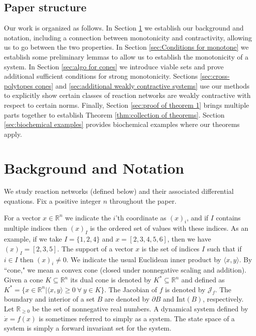 \documentclass{article}
\begin{document}
\subsection{Paper structure}
Our work is organized as follows. In Section \ref{sec:background} we establish our background and notation, including a connection between monotonicity and contractivity, allowing us to go between the two properties. In Section \ref{sec:Conditions for monotone} we establish some preliminary lemmas to allow us to establish the monotonicity of a system. In Section \ref{sec:algo for cones} we introduce viable sets and prove additional sufficient conditions for strong monotonicity. Sections \ref{sec:cross-polytopes cones} and \ref{sec:additional weakly contractive systems} use our methods to explicitly show certain classes of reaction networks are weakly contractive with respect to certain norms. Finally, Section \ref{sec:proof of theorem 1} brings multiple parts together to establish Theorem \ref{thm:collection of theorems}. Section \ref{sec:biochemical examples} provides biochemical examples where our theorems apply.









\section{Background and Notation}
\label{sec:background}


We study reaction networks (defined below) and their associated differential equations. Fix a positive integer $n$ throughout the paper.


For a vector $x \in \mathbb{R}^n$ we indicate the $i$'th coordinate as $(x)_i$, and if $I$ contains multiple indices then $(x)_I$ is the ordered set of values with these indices. As an example, if we take $I = \{1,2,4\}$ and $x = [2,3,4,5,6]$, then we have $(x)_I = [2,3,5]$. The support of a vector $x$ is the set of indices $I$ such that if $i \in I$ then $(x)_i \neq 0$. We indicate the usual Euclidean inner product by $\langle x,y \rangle$. By ``cone," we mean a convex cone (closed under nonnegative scaling and addition). Given a cone $K \subseteq \mathbb{R}^n$ its dual cone is denoted by $K^* \subseteq \mathbb{R}^n$ and defined as $K^* = \{x \in \mathbb{R}^n| \langle x, y\rangle \geq 0 \ \forall \ y \in K \}$. The Jacobian of $f$ is denoted by $\mathcal{J}_f$. The boundary and interior of a set $B$ are denoted by $\partial B$ and $\mbox{Int}(B)$, respectively. Let $\mathbb{R}_{\geq 0}$ be the set of nonnegative real numbers. A dynamical system defined by $\dot{x} = f(x)$ is sometimes referred to simply as a system. The state space of a system is simply a forward invariant set for the system.
\end{document}
